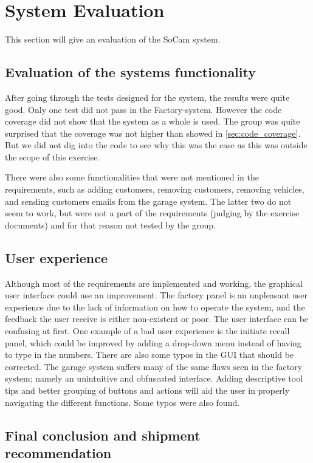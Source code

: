 \section{System Evaluation}

This section will give an evaluation of the SoCam system.

\subsection{Evaluation of the systems functionality}
After going through the tests designed for the system, the results were quite good. Only one test did not pass in the Factory-system. However the code coverage did not show that the system as a whole is used. The group was quite surprised that the coverage was not higher than showed in \autoref{sec:code_coverage}. But we did not dig into the code to see why this was the case as this was outside the scope of this exercise. 

There were also some functionalities that were not mentioned in the requirements, such as adding customers, removing customers, removing vehicles, and sending customers emails from the garage system. The latter two do not seem to work, but were not a part of the requirements (judging by the exercise documents) and for that reason not tested by the group. 

\subsection{User experience}

Although most of the requirements are implemented and working, the graphical user interface could use an improvement. The factory panel is an unpleasant user experience due to the lack of information on how to operate the system, and the feedback the user receive is either non-existent or poor. The user interface can be confusing at first. One example of a bad user experience is the initiate recall panel, which could be improved by adding a drop-down menu instead of having to type in the numbers. There are also some typos in the GUI that should be corrected. The garage system suffers many of the same flaws seen in the factory system; namely an unintuitive and obfuscated interface. Adding descriptive tool tips and better grouping of buttons and actions will aid the user in properly navigating the different functions. Some typos were also found.


\subsection{Final conclusion and shipment recommendation}

